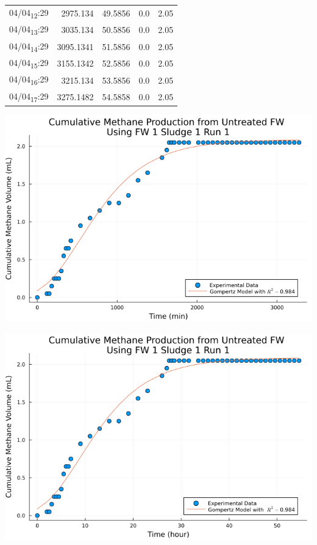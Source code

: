\documentclass[11pt]{article}
\begin{document}
\begin{center}
\begin{tabular}{lrrrr}
04/04\textsubscript{12}:29 & 2975.134 & 49.5856 & 0.0 & 2.05\\[0pt]
04/04\textsubscript{13}:29 & 3035.134 & 50.5856 & 0.0 & 2.05\\[0pt]
04/04\textsubscript{14}:29 & 3095.1341 & 51.5856 & 0.0 & 2.05\\[0pt]
04/04\textsubscript{15}:29 & 3155.1342 & 52.5856 & 0.0 & 2.05\\[0pt]
04/04\textsubscript{16}:29 & 3215.134 & 53.5856 & 0.0 & 2.05\\[0pt]
04/04\textsubscript{17}:29 & 3275.1482 & 54.5858 & 0.0 & 2.05\\[0pt]
\end{tabular}
\end{center}

\begin{center}
\includegraphics[width=.9\linewidth]{../plots/BMPs/Untreated FW/methane_kinetics_untreated_fw_s1_r1_min.png}
\end{center}

\begin{center}
\includegraphics[width=.9\linewidth]{../plots/BMPs/Untreated FW/methane_kinetics_untreated_fw_s1_r1_hour.png}
\end{center}
\end{document}
